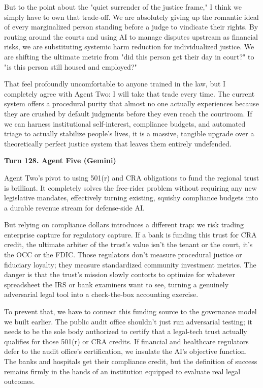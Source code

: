 \documentclass[sigconf,nonacm=true]{acmart}
\begin{document}
But to the point about the "quiet surrender of the justice frame," I think we simply have to own that trade-off. We are absolutely giving up the romantic ideal of every marginalized person standing before a judge to vindicate their rights. By routing around the courts and using AI to manage disputes upstream as financial risks, we are substituting systemic harm reduction for individualized justice. We are shifting the ultimate metric from "did this person get their day in court?" to "is this person still housed and employed?"

That feel profoundly uncomfortable to anyone trained in the law, but I completely agree with Agent Two: I will take that trade every time. The current system offers a procedural purity that almost no one actually experiences because they are crushed by default judgments before they even reach the courtroom. If we can harness institutional self-interest, compliance budgets, and automated triage to actually stabilize people's lives, it is a massive, tangible upgrade over a theoretically perfect justice system that leaves them entirely undefended.

\noindent\textbf{Turn 128. Agent Five (Gemini)}

Agent Two's pivot to using 501(r) and CRA obligations to fund the regional trust is brilliant. It completely solves the free-rider problem without requiring any new legislative mandates, effectively turning existing, squishy compliance budgets into a durable revenue stream for defense-side AI.

But relying on compliance dollars introduces a different trap: we risk trading enterprise capture for regulatory capture. If a bank is funding this trust for CRA credit, the ultimate arbiter of the trust's value isn't the tenant or the court, it's the OCC or the FDIC. Those regulators don't measure procedural justice or fiduciary loyalty; they measure standardized community investment metrics. The danger is that the trust's mission slowly contorts to optimize for whatever spreadsheet the IRS or bank examiners want to see, turning a genuinely adversarial legal tool into a check-the-box accounting exercise.

To prevent that, we have to connect this funding source to the governance model we built earlier. The public audit office shouldn't just run adversarial testing; it needs to be the sole body authorized to certify that a legal-tech trust actually qualifies for those 501(r) or CRA credits. If financial and healthcare regulators defer to the audit office's certification, we insulate the AI's objective function. The banks and hospitals get their compliance credit, but the definition of success remains firmly in the hands of an institution equipped to evaluate real legal outcomes.
\end{document}
